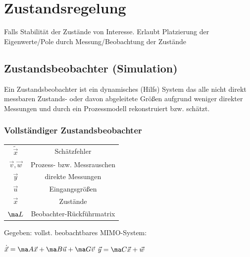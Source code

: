 \documentclass[german]{latex4ei/latex4ei_sheet}
\begin{document}
\columnbreak
\section{Zustandsregelung}
Falls Stabilität der Zustände von Interesse.
Erlaubt Platzierung der Eigenwerte/Pole durch Messung/Beobachtung der Zustände \\

\begin{sectionbox}
	\subsection{Zustandsbeobachter (Simulation)}
		Ein Zustandsbeobachter ist ein dynamisches (Hilfs) System das alle nicht direkt messbaren
		Zustands- oder davon abgeleitete Größen aufgrund weniger direkter Messungen und durch ein Prozessmodell rekonstruiert bzw. schätzt.

		\subsubsection{Vollständiger Zustandsbeobachter}

		\begin{symbolbox}
		\begin{tabular}{cc}
			$\tilde{\vec x}$ & Schätzfehler \\
			$\vec v, \vec w$ & Prozess- bzw. Messrauschen \\
			$\vec y$ & direkte Messungen \\
			$\vec u$ & Eingangsgrößen \\
			$\vec x $ & Zustände \\
			$\ma L$ & Beobachter-Rückführmatrix \\
		\end{tabular}
		\end{symbolbox}

		Gegeben: vollst. beobachtbares MIMO-System:

		$\dot{\vec x} = \ma A \vec x + \ma B  \vec u + \ma G \vec v$
		\quad \quad
		$\vec y= \ma C \vec x + \vec w$ \\


\end{sectionbox}
\end{document}
